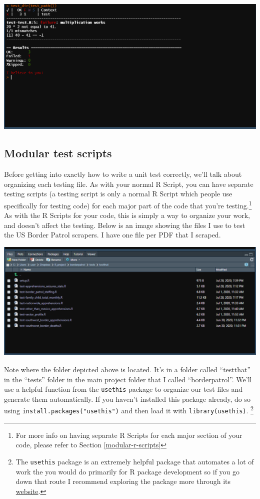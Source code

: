 \documentclass[
  12pt,
]{book}
\begin{document}
\includegraphics{images/test_summary.PNG}

\hypertarget{modular-test-scripts}{%
\subsection{Modular test scripts}\label{modular-test-scripts}}

Before getting into exactly how to write a unit test correctly, we'll talk about organizing each testing file. As with your normal R Script, you can have separate testing scripts (a testing script is only a normal R Script which people use specifically for testing code) for each major part of the code that you're testing.\footnote{For more info on having separate R Scripts for each major section of your code, please refer to Section \ref{modular-r-scripts}} As with the R Scripts for your code, this is simply a way to organize your work, and doesn't affect the testing. Below is an image showing the files I use to test the US Border Patrol scrapers. I have one file per PDF that I scraped.

\includegraphics{images/test_file_setup.PNG}

Note where the folder depicted above is located. It's in a folder called ``testthat'' in the ``tests'' folder in the main project folder that I called ``borderpatrol''. We'll use a helpful function from the \texttt{usethis} package to organize our test files and generate them automatically. If you haven't installed this package already, do so using \texttt{install.packages("usethis")} and then load it with \texttt{library(usethis)}. \footnote{The \texttt{usethis} package is an extremely helpful package that automates a lot of work the you would do primarily for R package development so if you go down that route I recommend exploring the package more through its \href{https://usethis.r-lib.org/index.html}{website}.}
\end{document}
